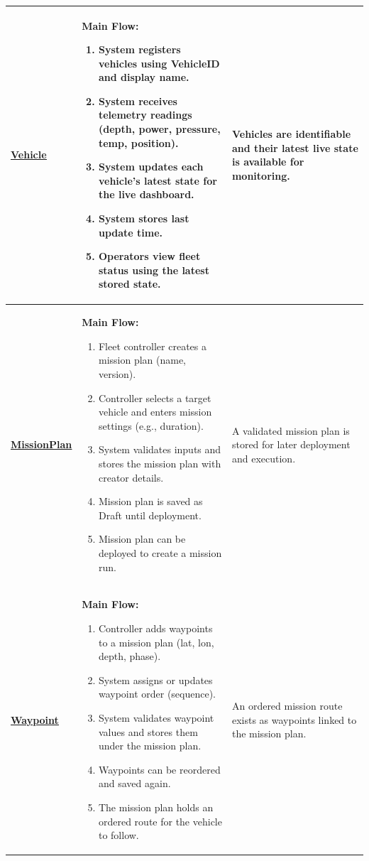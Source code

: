 \documentclass[11pt,a4paper]{article}
\let\orighyperref\hyperref
\renewcommand{\hyperref}[2][]{\orighyperref[#1]{\uline{#2}}}%
\begin{document}
\begin{longtable}{|>{\raggedright\arraybackslash}p{}|>{\raggedright\arraybackslash}p{}|>{\raggedright\arraybackslash}p{}|}
\textbf{\hyperref[tab:data-dictionary-vehicle]{Vehicle}}\label{flow-Vehicle} &
\textbf{Main Flow:}\begin{enumerate}[leftmargin=*,nosep]
  \item System registers vehicles using VehicleID and display name.
  \item System receives telemetry readings (depth, power, pressure, temp, position).
  \item System updates each vehicle’s latest state for the live dashboard.
  \item System stores last update time.
  \item Operators view fleet status using the latest stored state.
\end{enumerate} &
Vehicles are identifiable and their latest live state is available for monitoring. \\
\hline

\textbf{\hyperref[tab:data-dictionary-missionplan]{MissionPlan}}\label{flow-MissionPlan} &
\textbf{Main Flow:}\begin{enumerate}[leftmargin=*,nosep]
  \item Fleet controller creates a mission plan (name, version).
  \item Controller selects a target vehicle and enters mission settings (e.g., duration).
  \item System validates inputs and stores the mission plan with creator details.
  \item Mission plan is saved as Draft until deployment.
  \item Mission plan can be deployed to create a mission run.
\end{enumerate} &
A validated mission plan is stored for later deployment and execution. \\
\hline

\textbf{\hyperref[tab:data-dictionary-waypoint]{Waypoint}}\label{flow-Waypoint} &
\textbf{Main Flow:}\begin{enumerate}[leftmargin=*,nosep]
  \item Controller adds waypoints to a mission plan (lat, lon, depth, phase).
  \item System assigns or updates waypoint order (sequence).
  \item System validates waypoint values and stores them under the mission plan.
  \item Waypoints can be reordered and saved again.
  \item The mission plan holds an ordered route for the vehicle to follow.
\end{enumerate} &
An ordered mission route exists as waypoints linked to the mission plan. \\
\hline


\end{longtable}
\end{document}
